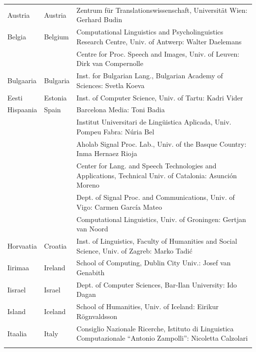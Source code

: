 \small
\begin{longtable}{llp{105mm}}
  Austria & \textcolor{grey1}{Austria} & Zentrum für Translationswissenschaft, Universität Wien: Gerhard Budin\\ \addlinespace 
  Belgia & \textcolor{grey1}{Belgium} & Computational Linguistics and Psycholinguistics Research Centre, Univ. of Antwerp: Walter Daelemans\\ \addlinespace
  & & Centre for Proc. Speech and Images, Univ. of Leuven: Dirk van Compernolle \\ \addlinespace
  Bulgaaria & \textcolor{grey1}{Bulgaria} & Inst. for Bulgarian Lang., Bulgarian Academy of Sciences: Svetla Koeva \\ \addlinespace
  Eesti & \textcolor{grey1}{Estonia} & Inst. of Computer Science, Univ. of Tartu: Kadri Vider\\ \addlinespace
  Hispaania & \textcolor{grey1}{Spain} & Barcelona Media: Toni Badia \\ \addlinespace 
  & & Institut Universitari de Lingüistica Aplicada, Univ. Pompeu Fabra: Núria Bel \\ \addlinespace 
  & & Aholab Signal Proc. Lab., Univ. of the Basque Country: Inma Hernaez Rioja \\ \addlinespace 
  & & Center for Lang. and Speech Technologies and Applications, Technical Univ. of Catalonia: Asunción Moreno \\ \addlinespace 
  & & Dept. of Signal Proc. and Communications, Univ. of Vigo: Carmen García Mateo \\ \addlinespace 
  & & Computational Linguistics, Univ. of Groningen: Gertjan van Noord\\ \addlinespace
  Horvaatia & \textcolor{grey1}{Croatia} & Inst. of Linguistics, Faculty of Humanities and Social Science, Univ. of Zagreb: Marko Tadić \\ \addlinespace
  Iirimaa & \textcolor{grey1}{Ireland} & School of Computing, Dublin City Univ.: Josef van Genabith\\ 
\addlinespace Iisrael & \textcolor{grey1}{Israel} & Dept. of Computer Sciences, Bar-Ilan University: Ido Dagan \\
\addlinespace  
  Island & \textcolor{grey1}{Iceland} & School of Humanities, Univ. of Iceland: Eirikur Rögnvaldsson\\ \addlinespace
  Itaalia & \textcolor{grey1}{Italy} & Consiglio Nazionale Ricerche, Istituto di Linguistica Computazionale ``Antonio Zampolli'': Nicoletta Calzolari\\ \addlinespace

\end{longtable}
